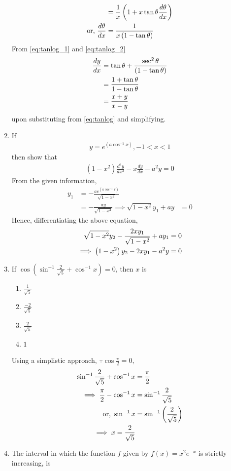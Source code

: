 \documentclass[journal,12pt,twocolumn]{IEEEtran}
\renewcommand\thesection{\arabic{section}}
\begin{document}
\begin{enumerate}[label=\thesection.\arabic*.,ref=\thesection.\theenumi]
\begin{align}
			&= \frac{1}{x}\left(1 + x \tan \theta \frac{d\theta}{dx}\right)
			\\
			\text{or, } \frac{d\theta}{dx} &= \frac{1}{x\left(1 - \tan \theta\right)}
\label{eq:tanlog_2}
		\end{align}
From \eqref{eq:tanlog_1} and 
\eqref{eq:tanlog_2}
		\begin{align}
			\frac{dy}{dx} &= \tan \theta +  \frac{\sec^2 \theta}{\left(1 - \tan \theta\right)}
			\\
			&= \frac{1 + \tan \theta}{{1 - \tan \theta}}
			\\
			&= \frac{x + y}{x-y}
		\end{align}
upon substituting from \eqref{eq:tanlog} and simplifying.

\item If  \begin{align} y=e^{(a\cos^{-1}x)}  , -1 < x < 1 \nonumber \end{align}  then show that  \begin{align} (1-x^2) \frac{d^2y}{dx^2} - x \frac{dy}{dx} - a^2y =0 \nonumber \end{align}
		\solution From the given information, 
		\begin{align}
			y_1 &= -\frac{ae^{(a\cos^{-1}x)}}{\sqrt{1-x^2}}
			\\
			&= -\frac{ay}{\sqrt{1-x^2}}
			\implies \sqrt{1-x^2}y_1 + ay &= 0
		\end{align}
		Hence,  differentiating the above equation, 
		\begin{align}
			\sqrt{1-x^2 }	y_2 - \frac{2xy_1}{\sqrt{1-x^2}} + ay_1 &= 0
			\\
			\implies 
			\left(1-x^2 \right)	y_2 - 2xy_1 - a^2y &= 0
		\end{align}

\item If $\cos (\sin^{-1} \frac{2}{\sqrt 5} + \cos^{-1} x) = 0$, then $x$ is  

\begin{enumerate}
   \item $\frac{1}{\sqrt5}$\\
   \item $ \frac{-2}{\sqrt5}$\\
    \item $ \frac{2}{\sqrt5}$\\
    \item $1$
\end{enumerate}
		\solution  Using a simplistic approach,  $\because \cos \frac{\pi}{2} = 0$,
		\begin{align}
			\sin^{-1} \frac{2}{\sqrt 5} + \cos^{-1} x &= \frac{\pi}{2}
			\\
			\implies \frac{\pi}{2} -\cos^{-1}x &=  \sin^{-1} \frac{2}{\sqrt 5} 
			\\
			\text{or, }\sin^{-1}x &=  \sin^{-1} \left(\frac{2}{\sqrt 5}   \right)
			\\
			\implies x = \frac{2}{\sqrt 5}   
		\end{align}
\item The interval in which the function $f$ given by $ f({x}) = x^2e^{-x} $ is strictly increasing,  is


\end{enumerate}
\end{document}
